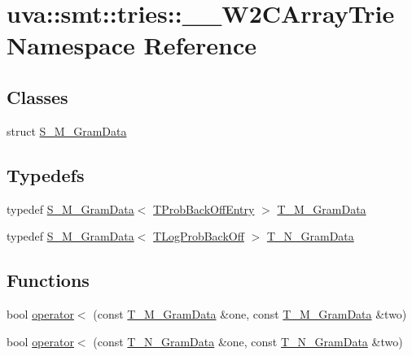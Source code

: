 \hypertarget{namespaceuva_1_1smt_1_1tries_1_1_____w2_c_array_trie}{}\section{uva\+:\+:smt\+:\+:tries\+:\+:\+\_\+\+\_\+\+W2\+C\+Array\+Trie Namespace Reference}
\label{namespaceuva_1_1smt_1_1tries_1_1_____w2_c_array_trie}
\subsection*{Classes}
\begin{DoxyCompactItemize}
\item 
struct \hyperlink{structuva_1_1smt_1_1tries_1_1_____w2_c_array_trie_1_1_s___m___gram_data}{S\+\_\+\+M\+\_\+\+Gram\+Data}
\end{DoxyCompactItemize}
\subsection*{Typedefs}
\begin{DoxyCompactItemize}
\item 
typedef \hyperlink{structuva_1_1smt_1_1tries_1_1_____w2_c_array_trie_1_1_s___m___gram_data}{S\+\_\+\+M\+\_\+\+Gram\+Data}$<$ \hyperlink{structuva_1_1smt_1_1tries_1_1_t_prob_back_off_entry}{T\+Prob\+Back\+Off\+Entry} $>$ \hyperlink{namespaceuva_1_1smt_1_1tries_1_1_____w2_c_array_trie_ac6f1755aebdfdd6bde13d9e91d22337d}{T\+\_\+\+M\+\_\+\+Gram\+Data}
\item 
typedef \hyperlink{structuva_1_1smt_1_1tries_1_1_____w2_c_array_trie_1_1_s___m___gram_data}{S\+\_\+\+M\+\_\+\+Gram\+Data}$<$ \hyperlink{namespaceuva_1_1smt_1_1tries_acd0660255dd9ef5d644f01de49102750}{T\+Log\+Prob\+Back\+Off} $>$ \hyperlink{namespaceuva_1_1smt_1_1tries_1_1_____w2_c_array_trie_ac05cbbe324aaedbe98213e21625e2774}{T\+\_\+\+N\+\_\+\+Gram\+Data}
\end{DoxyCompactItemize}
\subsection*{Functions}
\begin{DoxyCompactItemize}
\item 
bool \hyperlink{namespaceuva_1_1smt_1_1tries_1_1_____w2_c_array_trie_abab483f0992d513ef2299f3475edecf7}{operator$<$} (const \hyperlink{namespaceuva_1_1smt_1_1tries_1_1_____w2_c_array_trie_ac6f1755aebdfdd6bde13d9e91d22337d}{T\+\_\+\+M\+\_\+\+Gram\+Data} \&one, const \hyperlink{namespaceuva_1_1smt_1_1tries_1_1_____w2_c_array_trie_ac6f1755aebdfdd6bde13d9e91d22337d}{T\+\_\+\+M\+\_\+\+Gram\+Data} \&two)
\item 
bool \hyperlink{namespaceuva_1_1smt_1_1tries_1_1_____w2_c_array_trie_a1736a3665d389af3871c1d16ab681a52}{operator$<$} (const \hyperlink{namespaceuva_1_1smt_1_1tries_1_1_____w2_c_array_trie_ac05cbbe324aaedbe98213e21625e2774}{T\+\_\+\+N\+\_\+\+Gram\+Data} \&one, const \hyperlink{namespaceuva_1_1smt_1_1tries_1_1_____w2_c_array_trie_ac05cbbe324aaedbe98213e21625e2774}{T\+\_\+\+N\+\_\+\+Gram\+Data} \&two)
\end{DoxyCompactItemize}


